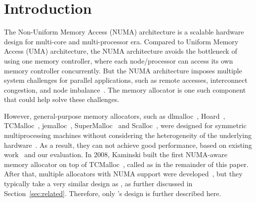 

\section{Introduction}
\label{sec:intro}

The Non-Uniform Memory Access (NUMA) architecture is a scalable hardware design for multi-core and multi-processor era. Compared to Uniform Memory Access (UMA) architecture, the NUMA architecture avoids the bottleneck of using one memory controller, where each node/processor can access its own memory controller concurrently. But the NUMA architecture imposes multiple system challenges for parallel applications, such as remote accesses, interconnect congestion, and node imbalance~\cite{Blagodurov:2011:CNC:2002181.2002182}. 
The memory allocator is one such component that could help solve these challenges.   

However, general-purpose memory allocators, such as dlmalloc~\cite{dlmalloc},  Hoard~\cite{Hoard}, TCMalloc~\cite{tcmalloc}, jemalloc~\cite{jemalloc}, SuperMalloc~\cite{supermalloc} and Scalloc~\cite{Scalloc}, were designed for symmetric multiprocessing machines without considering the heterogeneity of the underlying hardware~\cite{mimalloc}. As a result, they can not achieve good performance, based on existing work~\cite{tcmallocnew, yang2019jarena} and our evaluation. In 2008, Kaminski built the first NUMA-aware memory allocator on top of TCMalloc~\cite{tcmallocnew}, called as \TN{} in the remainder of this paper. After that, multiple allocators with NUMA support were developed~\cite{ kim2013node, yang2019jarena, mimalloc}, but they typically take a very similar design as \TN{} , as further discussed in Section~\ref{sec:related}. Therefore, only \TN{}'s design is further described here. 


